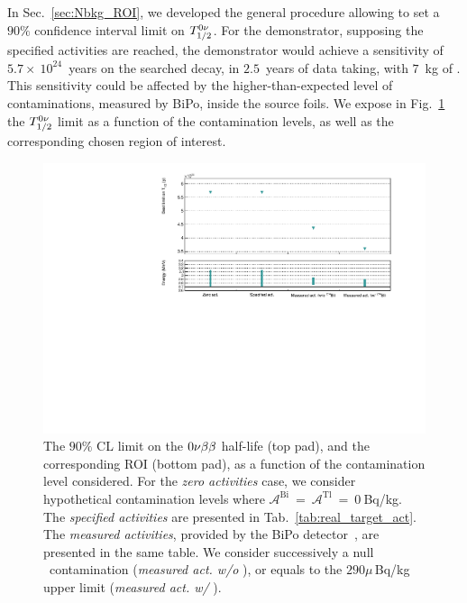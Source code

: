 In Sec.~\ref{sec:Nbkg_ROI}, we developed the general procedure allowing to set a $90\%$ confidence interval limit on $T_{1/2}^{0\nu}$.
For the demonstrator, supposing the specified activities are reached, the demonstrator would achieve a sensitivity of $5.7\times~10^{24}$~years on the searched decay, in $2.5$~years of data taking, with $7$~kg of \Se.
This sensitivity could be affected by the higher-than-expected level of contaminations, measured by BiPo, inside the source foils.
We expose in Fig.~\ref{fig:real_target_act} the $T_{1/2}^{0\nu}$ limit as a function of the contamination levels, as well as the corresponding chosen region of interest.
\begin{figure}[h]
  \centering
  \includegraphics[width=1.1\textwidth]{Sensitivity/fig_sensitivity/contamination_level_Se_B.pdf}
  \caption{The $90\%$ CL limit on the $0\nu\beta\beta$ half-life (top pad), and the corresponding ROI (bottom pad), as a function of the contamination level considered.
    For the \emph{zero activities} case, we consider hypothetical contamination levels where $\mathcal{A}^{\text{Bi}}~=~\mathcal{A}^{\text{Tl}}~=~0~$Bq/kg.
    The \emph{specified activities} are presented in Tab.~\ref{tab:real_target_act}.
    The \emph{measured activities}, provided by the BiPo detector~\cite{internal:bipo}, are presented in the same table.
    We consider successively a null \Bi\ contamination (\emph{measured act. w/o \Bi}), or equals to the $290\mu\,$Bq/kg upper limit (\emph{measured act. w/ \Bi}).
    \label{fig:real_target_act}}
\end{figure}
